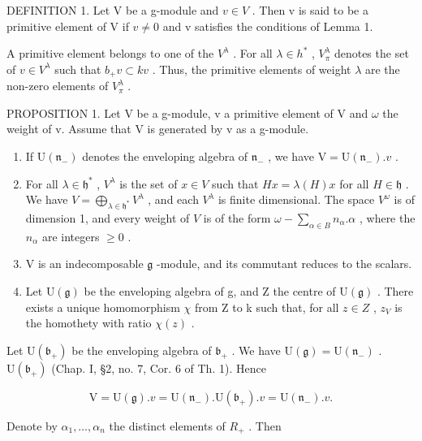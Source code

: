 DEFINITION 1. Let V be a g-module and \(v \in V\) . Then v is said to be a primitive element of V if \(v \neq 0\) and v satisfies the conditions of Lemma 1.

A primitive element belongs to one of the \(V^{\lambda}\) . For all \(\lambda\in h^{*}\) , \(V_{\pi}^{\lambda}\) denotes the set of \(v\in V^{\lambda}\) such that \(b_{+}v\subset kv\) . Thus, the primitive elements of weight \(\lambda\) are the non-zero elements of \(V_{\pi}^{\lambda}\) .

PROPOSITION 1. Let V be a g-module, v a primitive element of V and \(\omega\) the weight of v. Assume that V is generated by v as a g-module.

\begin{enumerate}
\def\labelenumi{(\roman{enumi})}
\item
  If \(\mathrm{U}(\mathfrak{n}_{-})\) denotes the enveloping algebra of \(\mathfrak{n}_{-}\) , we have \(\mathrm{V} = \mathrm{U}(\mathfrak{n}_{-}).v\) .
\item
  For all \(\lambda \in \mathfrak{h}^*\) , \(V^{\lambda}\) is the set of \(x \in V\) such that \(Hx = \lambda(H)x\) for all \(H \in \mathfrak{h}\) . We have \(V = \bigoplus_{\lambda \in \mathfrak{h}^*} V^{\lambda}\) , and each \(V^{\lambda}\) is finite dimensional. The space \(V^{\omega}\) is of dimension 1, and every weight of \(V\) is of the form \(\omega - \sum_{\alpha \in B} n_{\alpha}. \alpha\) , where the \(n_{\alpha}\) are integers \(\geq 0\) .
\item
  V is an indecomposable \(\mathfrak{g}\) -module, and its commutant reduces to the scalars.
\item
  Let \(\mathrm{U}(\mathfrak{g})\) be the enveloping algebra of g, and Z the centre of \(\mathrm{U}(\mathfrak{g})\) . There exists a unique homomorphism \(\chi\) from Z to k such that, for all \(z \in Z\) , \(z_{V}\) is the homothety with ratio \(\chi(z)\) .
\end{enumerate}

Let \(\mathrm{U}(\mathfrak{b}_{+})\) be the enveloping algebra of \(\mathfrak{b}_{+}\) . We have \(\mathrm{U}(\mathfrak{g}) = \mathrm{U}(\mathfrak{n}_{-})\) . \(\mathrm{U}(\mathfrak{b}_{+})\) (Chap. I, §2, no. 7, Cor. 6 of Th. 1). Hence

\[
\mathrm{V} = \mathrm{U} (\mathfrak {g}). v = \mathrm{U} (\mathfrak {n} _ {-}). \mathrm{U} (\mathfrak {b} _ {+}). v = \mathrm{U} (\mathfrak {n} _ {-}). v.
\]

Denote by \(\alpha_{1},\ldots,\alpha_{n}\) the distinct elements of \(R_{+}\) . Then

